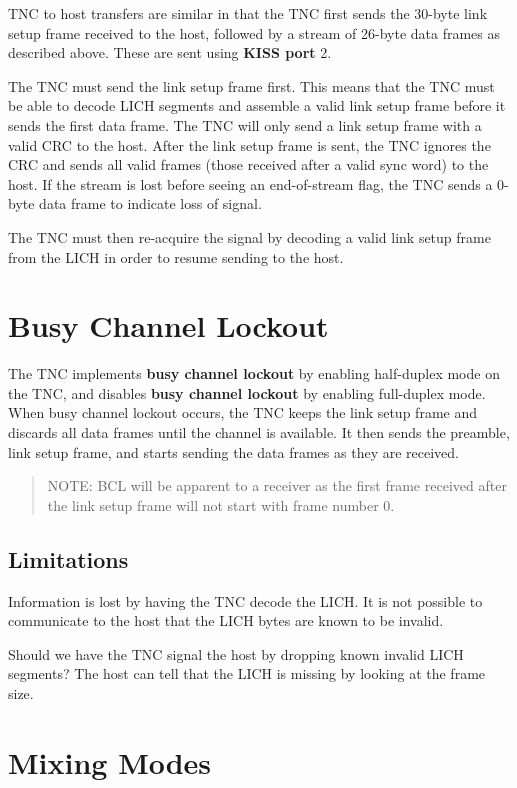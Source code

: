\documentclass[a4paper,11pt,oneside]{article}
\begin{document}
TNC to host transfers are similar in that the TNC first sends the 30-byte link setup frame received to the host, followed by a stream of 26-byte data frames as described above. These are sent using \textbf{KISS port} 2.

The TNC must send the link setup frame first. This means that the TNC must be able to decode LICH segments and assemble a valid link setup frame before it sends the first data frame. The TNC will only send a link setup frame with a valid CRC to the host. After the link setup frame is sent, the TNC ignores the CRC and sends all valid frames (those received after a valid sync word) to the host. If the stream is lost before seeing an end-of-stream flag, the TNC sends a 0-byte data frame to indicate loss of signal.

The TNC must then re-acquire the signal by decoding a valid link setup frame from the LICH in order to resume sending to the host.

\section{Busy Channel Lockout}

The TNC implements \textbf{busy channel lockout} by enabling half-duplex mode on the TNC, and disables \textbf{busy channel lockout} by enabling full-duplex mode. When busy channel lockout occurs, the TNC keeps the link setup frame and discards all data frames until the channel is available. It then sends the preamble, link setup frame, and starts sending the data frames as they are received.

\begin{quote}
	NOTE: BCL will be apparent to a receiver as the first frame received after the link setup frame will not start with frame number 0.
\end{quote}

\subsection{Limitations}

Information is lost by having the TNC decode the LICH. It is not possible to communicate to the host that the LICH bytes are known to be invalid.

Should we have the TNC signal the host by dropping known invalid LICH segments? The host can tell that the LICH is missing by looking at the frame size.

\section{Mixing Modes}
\end{document}
